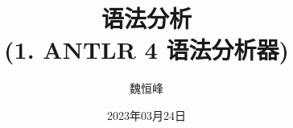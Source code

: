 \documentclass[]{beamer}
\title[语法分析]{语法分析 \\ (1. ANTLR 4 语法分析器)}
\author[魏恒峰]{\large 魏恒峰}
\institute{hfwei@nju.edu.cn}
\date{2023年03月24日}
\begin{document}
\maketitle
% 


\thankyou{}

\end{document}
